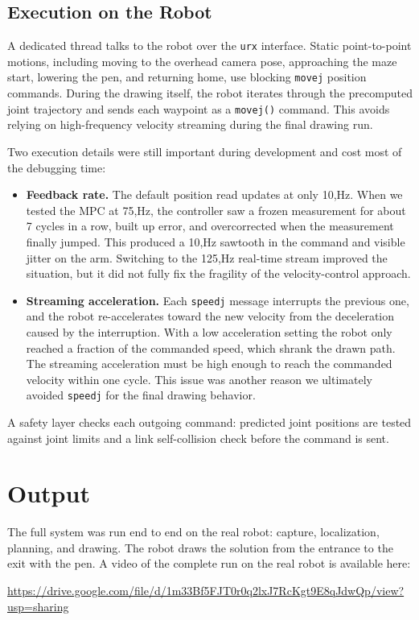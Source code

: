 \documentclass[11pt]{article}
\begin{document}
\subsection{Execution on the Robot}

A dedicated thread talks to the robot over the \texttt{urx} interface. Static point-to-point motions, including moving to the overhead camera pose, approaching the maze start, lowering the pen, and returning home, use blocking \texttt{movej} position commands. During the drawing itself, the robot iterates through the precomputed joint trajectory and sends each waypoint as a \texttt{movej()} command. This avoids relying on high-frequency velocity streaming during the final drawing run.

Two execution details were still important during development and cost most of the debugging time:

\begin{itemize}
\item \textbf{Feedback rate.} The default position read updates at only 10,Hz. When we tested the MPC at 75,Hz, the controller saw a frozen measurement for about 7 cycles in a row, built up error, and overcorrected when the measurement finally jumped. This produced a 10,Hz sawtooth in the command and visible jitter on the arm. Switching to the 125,Hz real-time stream improved the situation, but it did not fully fix the fragility of the velocity-control approach.
\item \textbf{Streaming acceleration.} Each \texttt{speedj} message interrupts the previous one, and the robot re-accelerates toward the new velocity from the deceleration caused by the interruption. With a low acceleration setting the robot only reached a fraction of the commanded speed, which shrank the drawn path. The streaming acceleration must be high enough to reach the commanded velocity within one cycle. This issue was another reason we ultimately avoided \texttt{speedj} for the final drawing behavior.
\end{itemize}

A safety layer checks each outgoing command: predicted joint positions are tested against joint limits and a link self-collision check before the command is sent.

\section{Output}

The full system was run end to end on the real robot: capture, localization, planning, and drawing. The robot draws the solution from the entrance to the exit with the pen. A video of the complete run on the real robot is available here:
\begin{center}
\url{https://drive.google.com/file/d/1m33Bf5FJT0r0q2lxJ7RcKgt9E8qJdwQp/view?usp=sharing}
\end{center}
\end{document}
